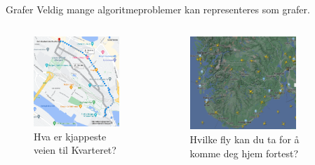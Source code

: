 \begin{frame}[fragile]{Grafer}
    Veldig mange algoritmeproblemer kan representeres som grafer.
    \begin{columns}
        \begin{column}{0.3\textwidth}
            \begin{figure}
                \includegraphics[width=4cm]{images/Kvarteret.png}
                \caption{Hva er kjappeste veien til Kvarteret?}
            \end{figure}
        \end{column}
        \begin{column}{0.3\textwidth}
            \begin{figure}
                \includegraphics[width=4cm]{images/Bergen.png}
                \caption{Hvilke fly kan du ta for å komme deg hjem fortest?}
            \end{figure}
        \end{column}
        \begin{column}{0.3\textwidth}
        \end{column}
    \end{columns}
\end{frame}


